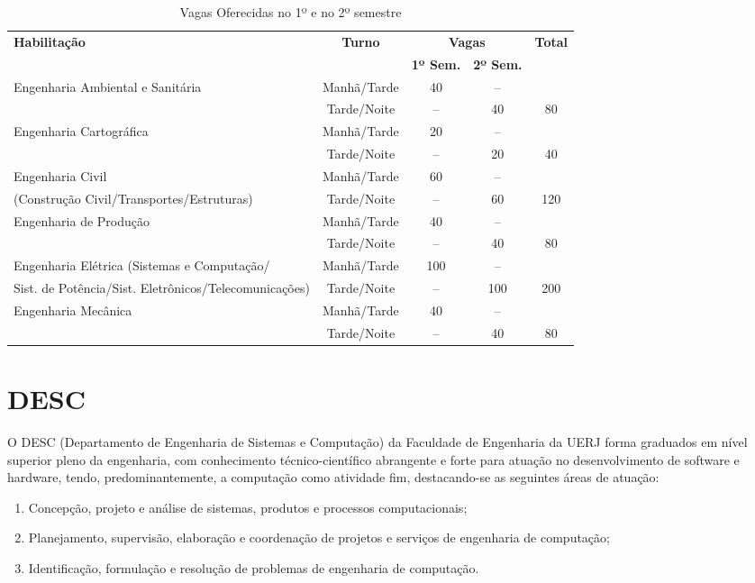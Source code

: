 \setlength{\tabcolsep}{5pt}
\begin{table}
\centering
\caption{Vagas Oferecidas no 1º e no 2º semestre}
\label{tabvagas}
\renewcommand{\arraystretch}{1.5}
\begin{tabularx}{\textwidth}{|X|c|c|c|c|}
\hline
\multirow{2}{*}{\textbf{Habilitação}} & \multirow{2}{*}{\textbf{Turno}} & \multicolumn{2}{|c|}{\textbf{Vagas}} & \multirow{2}{*}{\textbf{Total}} \\\cline{3-4}
 & & \textbf{1º Sem.} & \textbf{2º Sem.} & \\
 \hline
 Engenharia Ambiental 
 e Sanitária  & Manhã/Tarde & 40  & -- &   \\
  & Tarde/Noite & -- & 40 & 80 \\
\hline
Engenharia Cartográfica & Manhã/Tarde & 20  & -- &   \\
& Tarde/Noite & -- & 20 & 40 \\
 \hline
Engenharia Civil & Manhã/Tarde & 60  & -- &   \\
(Construção Civil/Transportes/Estruturas)  & Tarde/Noite & -- & 60 & 120 \\
 \hline
Engenharia de Produção & Manhã/Tarde & 40  & -- &   \\
& Tarde/Noite & -- & 40 & 80 \\
\hline
Engenharia Elétrica (Sistemas e Computação/
& Manhã/Tarde & 100  & -- &   \\
 Sist. de Potência/Sist. Eletrônicos/Telecomunicações)& Tarde/Noite & -- & 100 & 200 \\
\hline
Engenharia Mecânica & Manhã/Tarde & 40  & -- &   \\
 & Tarde/Noite & -- & 40 & 80 \\
 \hline
\end{tabularx}
\end{table}

\chapter{DESC}

O DESC (Departamento de Engenharia de Sistemas e Computação) da Faculdade de Engenharia da UERJ forma graduados em nível superior pleno da engenharia, com conhecimento técnico-científico abrangente e forte para atuação no desenvolvimento de software e hardware, tendo, predominantemente, a computação como atividade fim, destacando-se as seguintes áreas de atuação:
\begin{enumerate}
\item Concepção, projeto e análise de sistemas, produtos e processos computacionais;
\item Planejamento, supervisão, elaboração e coordenação de projetos e serviços de engenharia de computação;
\item Identificação, formulação e resolução de problemas de engenharia de computação.
\end{enumerate}
  
